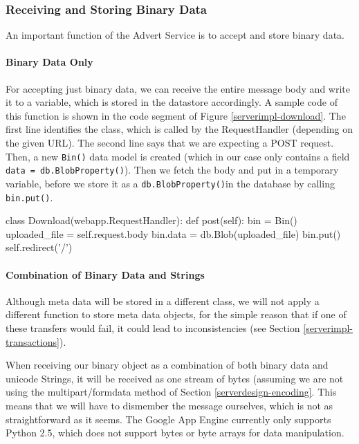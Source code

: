 \subsubsection{Receiving and Storing Binary Data}
An important function of the Advert Service is to accept and store binary data.

\paragraph{Binary Data Only}
For accepting just binary data, we can receive the entire message body and write
it to a variable, which is stored in the datastore accordingly. A sample code of
this function is shown in the code segment of Figure \ref{serverimpl-download}.
The first line identifies the class, which is called by the RequestHandler
(depending on the given URL). The second line says that we are expecting a POST
request. Then, a new \texttt{Bin()} data model is created (which in our case only
contains a field \texttt{data = db.BlobProperty()}). Then we fetch the body and
put in a temporary variable, before we store it as a \texttt{db.BlobProperty()}in
the database by calling \texttt{bin.put()}.

\begin{figure*}[ht] %
\begin{center}
\begin{code}
class Download(webapp.RequestHandler):
  def post(self):
    bin = Bin()
    uploaded_file = self.request.body
    bin.data = db.Blob(uploaded_file)
    bin.put()
    self.redirect('/')
\end{code}
\caption{Accepting Binary Data.\label{serverimpl-download}}
\end{center}
\end{figure*}
      
\paragraph{Combination of Binary Data and Strings}
Although meta data will be stored in a different class, we will not apply a
different function to store meta data objects, for the simple reason that if one
of these transfers would fail, it could lead to inconsistencies (see Section
\ref{serverimpl-transactions}).

When receiving our binary object as a combination of both binary data and
unicode Strings, it will be received as one stream of bytes (assuming we are not
using the multipart/formdata method of Section \ref{serverdesign-encoding}.
This means that we will have to dismember the message ourselves, which is
not as straightforward as it seems. The Google App Engine currently only
supports Python 2.5, which does not support bytes or byte arrays for data
manipulation.

